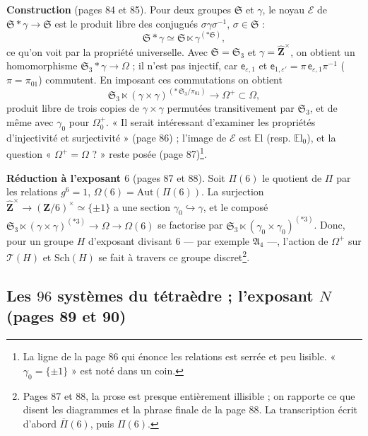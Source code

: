 \documentclass[11pt,a4paper]{article}
\begin{document}
\textbf{Construction} (pages 84 et 85). Pour deux groupes $\mathfrak{S}$ et
$\gamma$, le noyau $\mathcal{E}$ de $\mathfrak{S} * \gamma \to \mathfrak{S}$ est
le produit libre des conjugués $\sigma\gamma\sigma^{-1}$, $\sigma \in
\mathfrak{S}$ :
\[
  \mathfrak{S} * \gamma \simeq \mathfrak{S} \ltimes \gamma^{(*\mathfrak{S})} ,
\]
ce qu'on voit par la propriété universelle. Avec $\mathfrak{S} = \mathfrak{S}_3$
et $\gamma = \widehat{\mathbf{Z}}^\times$, on obtient un homomorphisme
$\mathfrak{S}_3 * \gamma \to \Omega$ ; il n'est pas injectif, car
$\mathsf{e}_{\varepsilon,1}$ et $\mathsf{e}_{1,\varepsilon'} = \pi\,
\mathsf{e}_{\varepsilon,1}\pi^{-1}$ ($\pi = \pi_{01}$) commutent. En imposant ces
commutations on obtient
\[
  \mathfrak{S}_3 \ltimes (\gamma \times \gamma)^{(*\, \mathfrak{S}_3/\pi_{01})}
  \longrightarrow \Omega^+ \subset \Omega ,
\]
produit libre de trois copies de $\gamma \times \gamma$ permutées
transitivement par $\mathfrak{S}_3$, et de même avec $\gamma_0$ pour
$\Omega_0^+$. « Il serait intéressant d'examiner les propriétés d'injectivité et
surjectivité » (page 86) ; l'image de $\mathcal{E}$ est $\mathbb{E}\mathrm{l}$
(resp. $\mathbb{E}\mathrm{l}_0$), et la question « $\Omega^+ = \Omega$ ? » reste
posée (page 87)\footnote{La ligne de la page 86 qui énonce les relations est
serrée et peu lisible. « $\gamma_0 = \{\pm1\}$ » est noté dans un coin.}.

\textbf{Réduction à l'exposant $6$} (pages 87 et 88). Soit $\Pi(6)$ le quotient de
$\Pi$ par les relations $g^6 = 1$, $\Omega(6) = \mathrm{Aut}(\Pi(6))$. La
surjection $\widehat{\mathbf{Z}}^\times \to (\mathbf{Z}/6)^\times \simeq \{\pm 1\}$
a une section $\gamma_0 \hookrightarrow \gamma$, et le composé
$\mathfrak{S}_3 \ltimes (\gamma \times \gamma)^{(*3)} \to \Omega \to \Omega(6)$
se factorise par $\mathfrak{S}_3 \ltimes (\gamma_0 \times \gamma_0)^{(*3)}$. Donc,
pour un groupe $H$ d'exposant divisant $6$ --- par exemple $\mathfrak{A}_4$ ---,
l'action de $\Omega^+$ sur $\mathcal{T}(H)$ et $\mathrm{Sch}(H)$ se fait à
travers ce groupe discret\footnote{Pages 87 et 88, la prose est presque
entièrement illisible ; on rapporte ce que disent les diagrammes et la phrase
finale de la page 88. La transcription écrit d'abord $\overline\Pi(6)$, puis
$\Pi(6)$.}.

\subsection*{Les $96$ systèmes du tétraèdre ; l'exposant $N$ (pages 89 et 90)}
\end{document}
